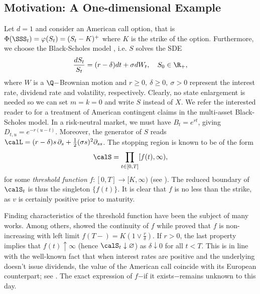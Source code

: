  \subsection{Motivation: A One-dimensional Example} \label{sec:1DExample}
 Let $d=1$ and consider an American call option, that is $\Phi(\SSS_t)=\varphi(S_t)=(S_t-K)^+$ where $K$ is the strike of the option. %
 Furthermore, we choose the Black-Scholes model \cite{BS}, i.e. $S$ solves the SDE 
 $$\frac{dS_t}{S_t} = (r-\delta)dt + \sigma dW_t, \quad S_0\in \R_+,$$
 where $W$ is a $\Q-$Brownian motion and  $r\ge 0,\ \delta \ge 0 ,\ \sigma > 0$ represent the interest rate, dividend rate and volatility, respectively.  Clearly, no  state enlargement is needed so we can set $m=k=0$ and write $S$ instead of $X$.
We refer the interested reader to \citet{Karatzas} for a treatment of American contingent claims in the multi-asset Black-Scholes model. 
In a risk-neutral market, we must have $B_t=e^{rt}$, giving $D_{t,u} = e^{-r(u-t)}$. Moreover, the generator of $S$ reads $\calL = (r-\delta)s\,  \partial_s + \frac{1}{2}(\sigma s)^2\partial_{ss}$. 
The  stopping region is known to be of the form $$\calS = \prod_{t\in [0,T]} [f(t), \infty), $$
 for some \textit{threshold function} $f:[0,T]\to [K,\infty)$  (see \cite{Merton,VB}).  The reduced boundary of $\calS_t$ is thus   the singleton $  \{f(t)\}$. %
 It is clear that $f$ is no less than the strike, as %
 $v$ is certainly positive prior to maturity.  %
 
 Finding characteristics of the threshold function have been  the subject of many works. Among others, \citet{VB} showed the continuity of $f$ while \citet{Kim} proved that $f$ is non-increasing  with left limit %
 $f(T-) = K (1 \vee \frac{r}{\delta})$. %
 If $r>0$,  the last property implies that $f(t) \uparrow \infty$ (hence $\calS_t \downarrow \varnothing$) as $\delta \downarrow 0$ for all $t<T$.  This is in line with the well-known fact that when interest rates are positive and the underlying doesn't issue dividends, the value of the American call coincide with its European counterpart; see \citet{Merton}. The exact expression  of $f$$-$if it exists$-$remains unknown to this day.

